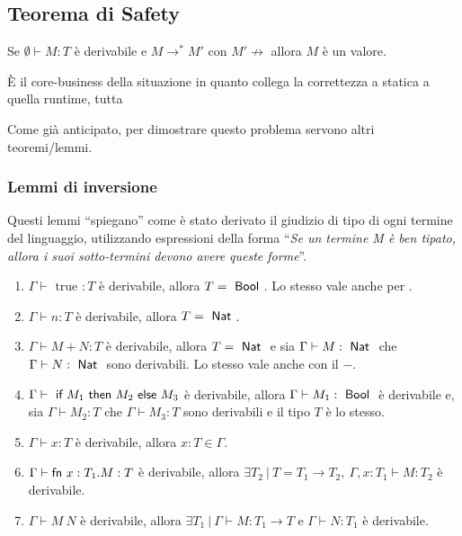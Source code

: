 


\subsection{Teorema di Safety}

\begin{center}
	Se $\emptyset \vdash M : T$ è derivabile e $M \rightarrow^* M'$ con $M' \not\rightarrow$ allora $M$ è un valore.
\end{center}

\`E il core-business della situazione in quanto collega la correttezza a statica a quella runtime, tutta

Come già anticipato, per dimostrare questo problema servono altri teoremi/lemmi.

\subsubsection{Lemmi di inversione}

Questi lemmi ``spiegano'' come è stato derivato il giudizio di tipo di ogni termine del linguaggio, utilizzando espressioni della forma ``\textit{Se un termine M è ben tipato, allora i suoi sotto-termini devono avere queste forme}''.

\begin{enumerate}
	\item $\Gamma \vdash \text{ true } : T $ è derivabile, allora $T = \Bool $. Lo stesso vale anche per .
	\item $\Gamma \vdash n : T$ è derivabile, allora $T = \Nat$.
	\item $\Gamma \vdash M + N : T$ è derivabile, allora $T = \Nat$ e sia $\Gamma \vdash M : \Nat$ che $\Gamma \vdash N : \Nat$ sono derivabili. Lo stesso vale anche con il $-$.
	\item $\Gamma \vdash \iif M_1 \then M_2 \eelse M_3$ è derivabile, allora $\Gamma \vdash M_1 : \Bool$ è derivabile e, sia $\Gamma \vdash M_2 : T $ che $\Gamma \vdash M_3 :T $ sono derivabili e il tipo $T$ è lo stesso.
	\item $\Gamma \vdash x : T$ è derivabile, allora $x : T \in \Gamma$.
	\item $\Gamma \vdash \fn x : T_1 . M : T$ è derivabile, allora $\exists T_2 \: | \: T = T_1 \rightarrow T_2, \: \Gamma, x:T_1 \vdash M : T_2$ è derivabile.
	\item $\Gamma \vdash M \: N$ è derivabile, allora $ \exists T_1 \: | \: \Gamma \vdash M : T_1 \rightarrow T $ e $\Gamma \vdash N : T_1 $ è derivabile.
\end{enumerate}

